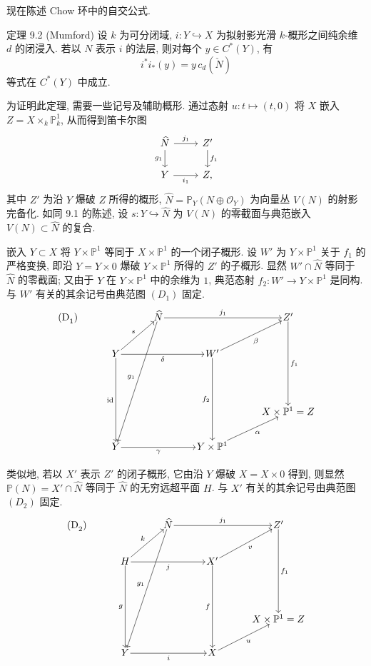 现在陈述 Chow 环中的自交公式.

\begin{statement}{定理 9.2 (Mumford)}
设 $k$ 为可分闭域, $i:Y\hookrightarrow X$ 为拟射影光滑 $k$-概形之间纯余维 $d$ 的闭浸入. 若以 $N$ 表示 $i$ 的法层, 则对每个 $y\in C^*(Y)$, 有
\[
i^*i_*(y)=y\,c_d(\check N)
\]
等式在 $C^*(Y)$ 中成立.
\end{statement}

为证明此定理, 需要一些记号及辅助概形. 通过态射 $u:t\mapsto(t,0)$ 将 $X$ 嵌入 $Z=X\times_k\mathbb P^1_k$, 从而得到笛卡尔图
\[
\begin{tikzcd}
\widehat N \arrow[r,"j_1"] \arrow[d,"g_1"'] & Z' \arrow[d,"f_1"]\\
Y \arrow[r,"i_1"'] & Z ,
\end{tikzcd}
\]
其中 $Z'$ 为沿 $Y$ 爆破 $Z$ 所得的概形, $\widehat N=\mathbb P_Y(N\oplus\mathcal O_Y)$ 为向量丛 $V(N)$ 的射影完备化. 如同 9.1 的陈述, 设 $s:Y\hookrightarrow\widehat N$ 为 $V(N)$ 的零截面与典范嵌入 $V(N)\subset\widehat N$ 的复合.

嵌入 $Y\subset X$ 将 $Y\times\mathbb P^1$ 等同于 $X\times\mathbb P^1$ 的一个闭子概形. 设 $W'$ 为 $Y\times\mathbb P^1$ 关于 $f_1$ 的严格变换, 即沿 $Y=Y\times0$ 爆破 $Y\times\mathbb P^1$ 所得的 $Z'$ 的子概形. 显然 $W'\cap\widehat N$ 等同于 $\widehat N$ 的零截面; 又由于 $Y$ 在 $Y\times\mathbb P^1$ 中的余维为 $1$, 典范态射 $f_2:W'\to Y\times\mathbb P^1$ 是同构. 与 $W'$ 有关的其余记号由典范图 $(D_1)$ 固定.
\[
\begin{tikzcd}[column sep=3.2em,row sep=2.4em,cells={nodes={inner sep=1pt}}]
\text{(D}_1\text{)}\arrow[from=1-3,to=5-2,"g_1"']
& & \widehat N \arrow[rr,"j_1"] & & Z' \arrow[ddd,"f_1"] \\
& Y \arrow[ur,"s"] \arrow[rr,"\delta"'] \arrow[ddd,"\mathrm{id}"'] & &
W' \arrow[ur,"\beta"'] \arrow[ddd,"f_2"'] & \\
& & & & \\
& & & & X\times\mathbb P^1=Z \\
& Y \arrow[rr,"\gamma"'] & & Y\times\mathbb P^1 \arrow[ur,"\alpha"'] &
\end{tikzcd}
\]

类似地, 若以 $X'$ 表示 $Z'$ 的闭子概形, 它由沿 $Y$ 爆破 $X=X\times0$ 得到, 则显然 $\mathbb P(N)=X'\cap\widehat N$ 等同于 $\widehat N$ 的无穷远超平面 $H$. 与 $X'$ 有关的其余记号由典范图 $(D_2)$ 固定.
\[
\begin{tikzcd}[column sep=3.2em,row sep=2.4em,cells={nodes={inner sep=1pt}}]
\text{(D}_2\text{)}\arrow[from=1-3,to=5-2,"g_1"']
& & \widehat N \arrow[rr,"j_1"] & & Z' \arrow[ddd,"f_1"] \\
& H \arrow[ur,"k"] \arrow[rr,"j"'] \arrow[ddd,"g"'] & &
X' \arrow[ur,"v"'] \arrow[ddd,"f"'] & \\
& & & & \\
& & & & X\times\mathbb P^1=Z \\
& Y \arrow[rr,"i"'] & & X \arrow[ur,"u"'] &
\end{tikzcd}
\]

